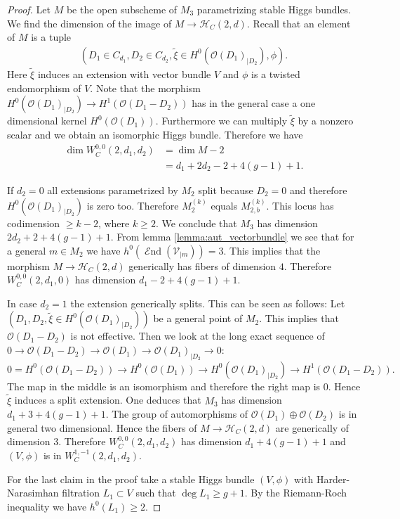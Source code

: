 \documentclass[12pt]{extarticle}
\theoremstyle{definition}
\numberwithin{theorem}{section}
\newcommand{\OO}{\mathcal{O}}
\newcommand{\cH}{\mathcal{H}}
\newcommand{\cV}{\mathcal{V}}
\DeclareMathOperator{\End}{\mathcal{E}nd}
\renewcommand{\tilde}{\widetilde}		%
\begin{document}
\begin{proof}
Let $M$ be the open subscheme of $M_3$ parametrizing stable Higgs bundles. We find the dimension of the image of $M\to \cH_C(2,d)$. Recall that an element of $M$ is a tuple
\begin{align*}
(D_1\in C_{d_1},D_2\in C_{d_2},\tilde{\xi} \in H^0(\OO(D_1)_{|D_2}),\phi).
\end{align*}
Here $\tilde{\xi}$ induces an extension with vector bundle $V$ and $\phi$ is a twisted endomorphism of $V$. Note that the morphism $H^0(\OO(D_1)_{|D_2}) \to H^1(\OO(D_1-D_2))$ has in the general case a one dimensional kernel $H^0(\OO(D_1))$. Furthermore we can multiply $\tilde{\xi}$ by a nonzero scalar and we obtain an isomorphic Higgs bundle. Therefore we have 
\begin{align}\label{eq:dimension_0,0unstable}
\dim W_C^{0,0}(2,d_1,d_2) &= \dim M - 2 \\
&= d_1 + 2d_2 -2 + 4(g-1)+1.
\end{align}

If $d_2 = 0$ all extensions parametrized by $M_2$ split because $D_2 = 0$ and therefore $H^0(\OO(D_1)_{|D_2})$ is zero too. Therefore $M^{(k)}_{2}$ equals $M^{(k)}_{2,b}$. This locus has codimension $\geq k-2$, where $k \geq 2$. We conclude that $M_3$ has dimension ${2d_2 +2  +4(g-1)+1}$. From lemma \ref{lemma:aut_vectorbundle} we see that for a general $m\in M_2$ we have $h^0(\End(\cV_{|m})) = 3$. This implies that the morphism $M \to \cH_C(2,d)$ generically has fibers of dimension $4$. Therefore $W_C^{0,0}(2,d_1,0)$ has dimension $d_1 -2  + 4(g-1)+1$. 

In case $d_2 = 1$ the extension generically splits. This can be seen as follows: Let ${(D_1,D_2,\tilde{\xi} \in H^0(\OO(D_1)_{|D_2}))}$ be a general point of $M_2$. This implies that $\OO(D_1-D_2)$ is not effective. Then we look at the long exact sequence of $0 \to \OO(D_1-D_2) \to \OO(D_1) \to \OO(D_1)_{|D_2} \to 0$:
\begin{equation*}
0 = H^0(\OO(D_1-D_2)) \to H^0(\OO(D_1)) \to H^0(\OO(D_1)_{|D_2}) \to H^1(\OO(D_1-D_2)).
\end{equation*} 
The map in the middle is an isomorphism and therefore the right map is $0$. Hence $\tilde{\xi}$ induces a split extension. One deduces that $M_3$ has dimension ${d_1 + 3 + 4(g-1) +1 }$. The group of automorphisms of $\OO(D_1)\oplus \OO(D_2)$ is in general two dimensional. Hence the fibers of $M\to \cH_C(2,d)$ are generically of dimension $3$. Therefore $W_C^{0,0}(2,d_1,d_2)$ has dimension $d_1 + 4(g-1) +1$ and $(V,\phi)$ is in $W_C^{1,-1}(2,d_1,d_2)$. 

For the last claim in the proof take a stable Higgs bundle $(V,\phi)$ with Harder-Narasimhan filtration $L_1 \subset V$ such that $\deg L_1 \geq g+1$. By the Riemann-Roch inequality we have $h^0(L_1)\geq 2$.
\end{proof}
\end{document}
